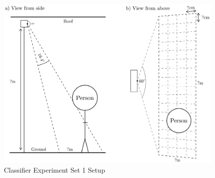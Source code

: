 \documentclass[../thesis/thesis.tex]{subfiles}
\begin{document}
\begin{landscape}
 \begin{figure}
 \centering
 \includegraphics[height=\textheight]{../diagrams/third-exp-setup2.pdf}
 \caption{Classifier Experiment Set 1 Setup}
 \label{fig:exps:3setup}
 \end{figure}
\end{landscape}

\end{document}
